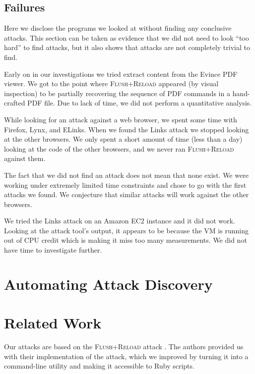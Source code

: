 \documentclass[letterpaper,twocolumn,10pt]{article}
\begin{document}
\subsection{Failures}
\label{sec:failures}

Here we disclose the programs we looked at without finding any conclusive
attacks. This section can be taken as evidence that we did not need to look
``too hard'' to find attacks, but it also shows that attacks are not completely
trivial to find.

Early on in our investigations we tried extract content from the Evince PDF
viewer. We got to the point where \textsc{Flush+Reload} appeared (by visual
inspection) to be partially recovering the sequence of PDF commands in
a hand-crafted PDF file. Due to lack of time, we did not perform a quantitative
analysis. 

While looking for an attack against a web browser, we spent some time with
Firefox, Lynx, and ELinks. When we found the Links attack we stopped looking at
the other browsers. We only spent a short amount of time (less than a day)
looking at the code of the other browsers, and we never ran \textsc{Flush+Reload} against
them.

The fact that we did not find an attack does not mean that none exist. We were
working under extremely limited time constraints and chose to go with the first
attacks we found. We conjecture that similar attacks will work against the other
browsers.

We tried the Links attack on an Amazon EC2 instance and it did not work. Looking
at the attack tool's output, it appears to be because the VM is running out of
CPU credit which is making it miss too many measurements. We did not have time
to investigate further.

\section{Automating Attack Discovery}

\section{Related Work}
\label{sec:relwork}

Our attacks are based on the \textsc{Flush+Reload} attack \cite{yarom2013flush}.
The authors provided us with their implementation of the attack, which we
improved by turning it into a command-line utility and making it accessible to
Ruby scripts.
\end{document}
